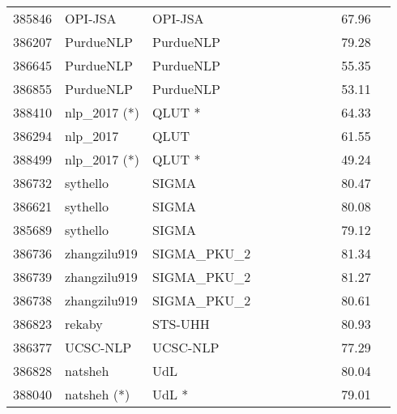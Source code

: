 \documentclass[11pt,a4paper]{article}
\begin{document}
\begin{table*}[htp!!]
\begin{center}
\begin{tabu}{|HHl| *{8}{S[table-format=2.2]|}}
385846 & OPI-JSA & OPI-JSA \cite{spiewak-sobecki-karas:2017:SemEval} &  &  &  &  &  &  & 67.96 & \\ 

386207 & PurdueNLP & PurdueNLP \cite{lee-EtAl:2017:SemEval} &  &  &  &  &  &  & 79.28 & \\ 

386645 & PurdueNLP & PurdueNLP \cite{lee-EtAl:2017:SemEval} &  &  &  &  &  &  & 55.35 & \\ 

386855 & PurdueNLP & PurdueNLP \cite{lee-EtAl:2017:SemEval} &  &  &  &  &  &  & 53.11 & \\

388410 & nlp\_2017 (*) & QLUT \cite{meng-EtAl:2017:SemEval1}* &  &  &  &  &  &  & 64.33 & \\ 

386294 & nlp\_2017 & QLUT \cite{meng-EtAl:2017:SemEval1} &  &  &  &  &  &  & 61.55 & \\ 

388499 & nlp\_2017 (*) & QLUT \cite{meng-EtAl:2017:SemEval1}* &  &  &  &  &  &  & 49.24 & \\ 

386732 & sythello & SIGMA &  &  &  &  &  &  & 80.47 & \\ 

386621 & sythello & SIGMA &  &  &  &  &  &  & 80.08 & \\

385689 & sythello & SIGMA &  &  &  &  &  &  & 79.12 & \\ 

386736 & zhangzilu919 & SIGMA\_PKU\_2 &  &  &  &  &  &  & 81.34 & \\ 

386739 & zhangzilu919 & SIGMA\_PKU\_2 &  &  &  &  &  &  & 81.27 & \\

386738 & zhangzilu919 & SIGMA\_PKU\_2 &  &  &  &  &  &  & 80.61 & \\

386823 & rekaby & STS-UHH \cite{kohail-salama-biemann:2017:SemEval} &  &  &  &  &  &  & 80.93 & \\

386377 & UCSC-NLP & UCSC-NLP &  &  &  &  &  &  & 77.29 & \\

386828 & natsheh & UdL \cite{alnatsheh-EtAl:2017:SemEval} &  &  &  &  &  &  & 80.04 & \\ 

388040 & natsheh (*) & UdL \cite{alnatsheh-EtAl:2017:SemEval}* &  &  &  &  &  &  & 79.01 & \\ 


\end{tabu}
\end{center}
\end{table*}
\end{document}
